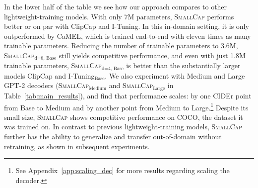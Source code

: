 \documentclass[10pt,twocolumn,letterpaper]{article}
\newcommand{\model}{\textsc{SmallCap}\xspace}
\begin{document}
In the lower half of the table we see how our approach compares to other lightweight-training models. %
With only 7M parameters, \model performs better or on par with ClipCap and I-Tuning. In this in-domain setting, it is only outperformed by CaMEL, which is trained end-to-end with eleven times as many trainable parameters.
Reducing the number of trainable parameters to 3.6M, %
\textsc{SmallCap}$_{\text{d=8, Base}}$ still yields competitive performance, and even with just 1.8M trainable parameters, \textsc{SmallCap}$_{\text{d=4, Base}}$ is better than the substantially larger models ClipCap and I-Tuning$_{\text{Base}}$. We also experiment with Medium and Large GPT-2 decoders (\textsc{SmallCap}$_{\text{Medium}}$ and \textsc{SmallCap}$_{\text{Large}}$ in Table~\ref{tab:main_results}), and find that performance scales: by one CIDEr point from Base to Medium and by another point from Medium to Large.\footnote{See Appendix~\ref{app:scaling_dec} for more results regarding scaling the decoder.} %
Despite its small size, \textsc{SmallCap} shows competitive performance on COCO, the dataset it was trained on. %
In contrast to previous lightweight-training models, \model further has the ability to generalize and transfer out-of-domain without retraining, as shown in subsequent experiments.
\end{document}
